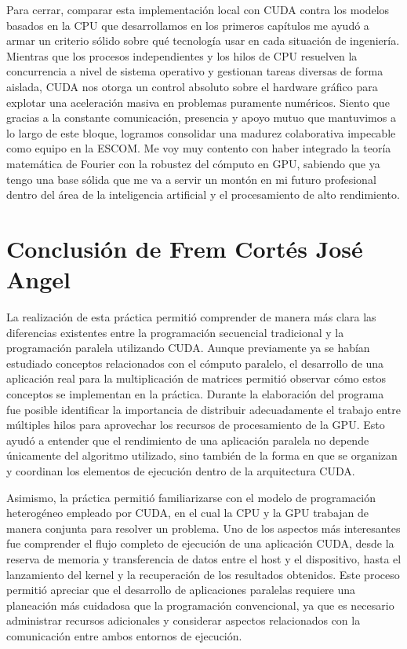 Para cerrar, comparar esta implementación local con CUDA contra los modelos basados en la CPU que desarrollamos en los primeros capítulos me ayudó a armar un criterio sólido sobre qué tecnología usar en cada situación de ingeniería. Mientras que los procesos independientes y los hilos de CPU resuelven la concurrencia a nivel de sistema operativo y gestionan tareas diversas de forma aislada, CUDA nos otorga un control absoluto sobre el hardware gráfico para explotar una aceleración masiva en problemas puramente numéricos. Siento que gracias a la constante comunicación, presencia y apoyo mutuo que mantuvimos a lo largo de este bloque, logramos consolidar una madurez colaborativa impecable como equipo en la ESCOM. Me voy muy contento con haber integrado la teoría matemática de Fourier con la robustez del cómputo en GPU, sabiendo que ya tengo una base sólida que me va a servir un montón en mi futuro profesional dentro del área de la inteligencia artificial y el procesamiento de alto rendimiento.

\newpage
\section{Conclusión de Frem Cortés José Angel}

La realización de esta práctica permitió comprender de manera más clara las diferencias existentes entre la programación secuencial tradicional y la programación paralela utilizando CUDA. Aunque previamente ya se habían estudiado conceptos relacionados con el cómputo paralelo, el desarrollo de una aplicación real para la multiplicación de matrices permitió observar cómo estos conceptos se implementan en la práctica. Durante la elaboración del programa fue posible identificar la importancia de distribuir adecuadamente el trabajo entre múltiples hilos para aprovechar los recursos de procesamiento de la GPU. Esto ayudó a entender que el rendimiento de una aplicación paralela no depende únicamente del algoritmo utilizado, sino también de la forma en que se organizan y coordinan los elementos de ejecución dentro de la arquitectura CUDA.

Asimismo, la práctica permitió familiarizarse con el modelo de programación heterogéneo empleado por CUDA, en el cual la CPU y la GPU trabajan de manera conjunta para resolver un problema. Uno de los aspectos más interesantes fue comprender el flujo completo de ejecución de una aplicación CUDA, desde la reserva de memoria y transferencia de datos entre el host y el dispositivo, hasta el lanzamiento del kernel y la recuperación de los resultados obtenidos. Este proceso permitió apreciar que el desarrollo de aplicaciones paralelas requiere una planeación más cuidadosa que la programación convencional, ya que es necesario administrar recursos adicionales y considerar aspectos relacionados con la comunicación entre ambos entornos de ejecución.

